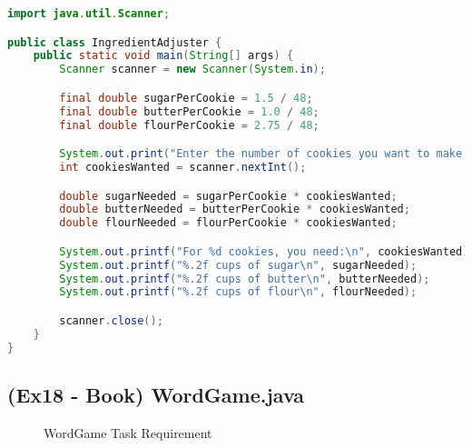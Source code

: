 \documentclass{article}
\begin{document}
\begin{lstlisting}[language=Java, caption=IngredientAdjuster.java]
import java.util.Scanner;

public class IngredientAdjuster {
    public static void main(String[] args) {
        Scanner scanner = new Scanner(System.in);

        final double sugarPerCookie = 1.5 / 48;
        final double butterPerCookie = 1.0 / 48;
        final double flourPerCookie = 2.75 / 48;

        System.out.print("Enter the number of cookies you want to make: ");
        int cookiesWanted = scanner.nextInt();

        double sugarNeeded = sugarPerCookie * cookiesWanted;
        double butterNeeded = butterPerCookie * cookiesWanted;
        double flourNeeded = flourPerCookie * cookiesWanted;

        System.out.printf("For %d cookies, you need:\n", cookiesWanted);
        System.out.printf("%.2f cups of sugar\n", sugarNeeded);
        System.out.printf("%.2f cups of butter\n", butterNeeded);
        System.out.printf("%.2f cups of flour\n", flourNeeded);

        scanner.close();
    }
}
\end{lstlisting}

\subsection*{(Ex18 - Book) WordGame.java}

\begin{figure}[H]
    \centering
    \caption{WordGame Task Requirement}
\end{figure}
\end{document}
